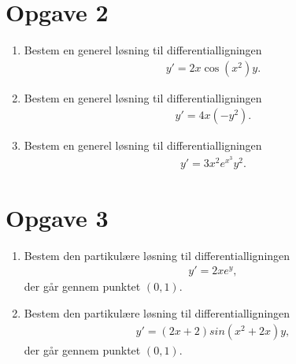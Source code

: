 \section*{Opgave 2}
\begin{enumerate}[label=\roman*)]
	\item Bestem en generel løsning til differentialligningen 
	\begin{align*}
		y' = 2x\cos(x^2)y.
	\end{align*}
	\item Bestem en generel løsning til differentialligningen 
	\begin{align*}
		y' = 4x(-y^2).
	\end{align*}
	\item Bestem en generel løsning til differentialligningen 
	\begin{align*}
		y' = 3x^2e^{x^3}y^2.
	\end{align*}
\end{enumerate}

\section*{Opgave 3}
\begin{enumerate}[label=\roman*)]
	\item Bestem den partikulære løsning til differentialligningen
	\begin{align*}
		y' = 2xe^y,
	\end{align*}
	der går gennem punktet $(0,1)$.
	\item Bestem den partikulære løsning til differentialligningen 
	\begin{align*}
		y' = (2x+2)sin(x^2+2x)y,
	\end{align*}
	der går gennem punktet $(0,1)$. 
\end{enumerate}